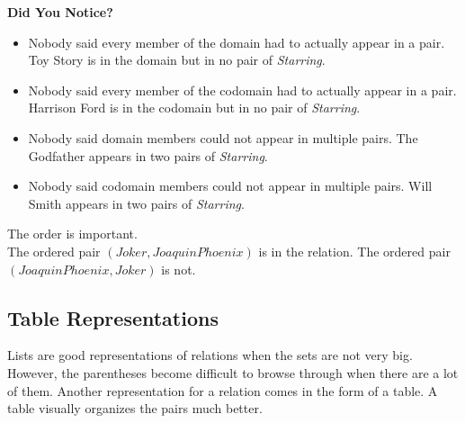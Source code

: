 \documentclass{ximera}
\begin{document}
\begin{warning} \textbf{\textcolor{red!80!black}{Did You Notice?}}  \\
\begin{itemize}
\item Nobody said every member of the domain had to actually appear in a pair.  Toy Story is in the domain but in no pair of \textit{Starring}.
\item Nobody said every member of the codomain had to actually appear in a pair.  Harrison Ford is in the codomain but in no pair of \textit{Starring}.
\item Nobody said domain members could not appear in multiple pairs.  The Godfather appears in two pairs of \textit{Starring}.
\item Nobody said codomain members could not appear in multiple pairs.  Will Smith appears in two pairs of \textit{Starring}.
\end{itemize}
\end{warning}


The order is important. \\

The ordered pair $(Joker, Joaquin Phoenix)$ is in the relation.  The ordered pair $(Joaquin Phoenix, Joker)$ is not. \\













\subsection*{Table Representations}

\hfill\break

Lists are good representations of relations when the sets are not very big. However, the parentheses become difficult to browse through when there are a lot of them. Another representation for a relation comes in the form of a table. A table visually organizes the pairs much better.
\end{document}
